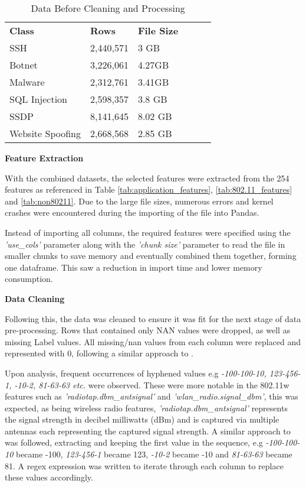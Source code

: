 \begin{table}[H]
\centering
\begin{tabular}{llllll}
\cline{1-3}
\textbf{Class}  & \textbf{Rows} & \textbf{File Size} &  &  &  \\ \cline{1-3}
SSH              & 2,440,571     & 3 GB               &  &  &  \\
Botnet           & 3,226,061     & 4.27GB             &  &  &  \\
Malware          & 2,312,761     & 3.41GB             &  &  &  \\
SQL Injection    & 2,598,357     & 3.8 GB             &  &  &  \\
SSDP             & 8,141,645     & 8.02 GB            &  &  &  \\
Website Spoofing & 2,668,568     & 2.85 GB            &  &  &  \\ \cline{1-3}
\end{tabular}
\caption{Data Before Cleaning and Processing}
\label{tab:full_data}
\end{table}

\medskip

\textbf{Feature Extraction}

\smallskip
With the combined datasets, the selected features were extracted from the 254 features as referenced in Table \ref{tab:application_features}, \ref{tab:802.11_features} and \ref{tab:non80211}. Due to the large file sizes, numerous errors and kernel crashes were encountered during the importing of the file into Pandas. 

Instead of importing all columns, the required features were specified using the \textit{'use\_cols'} parameter along with the \textit{'chunk size'} parameter to read the file in smaller chunks to save memory and eventually combined them together, forming one dataframe. This saw a reduction in import time and lower memory consumption.

\medskip
\textbf{Data Cleaning}

\smallskip
Following this, the data was cleaned to ensure it was fit for the next stage of data pre-processing. Rows that contained only NAN values were dropped, as well as missing Label values. All missing/nan values from each column were replaced and represented with 0, following a similar approach to \textcite{s22155633}.

\smallskip
Upon analysis, frequent occurrences of hyphened values e.g \textit{-100-100-10, 123-456-1, -10-2, 81-63-63 etc.} were observed. These were more notable in the 802.11w features such as \textit{'radiotap.dbm\_antsignal'} and \textit{'wlan\_radio.signal\_dbm'}, this was expected, as being wireless radio features, \textit{'radiotap.dbm\_antsignal'} represents the signal strength in decibel milliwatts (dBm) and is captured via multiple antennas each representing the captured signal strength. A similar approach to \parencite{s22155633} was followed, extracting and keeping the first value in the sequence, e.g \textit{-100-100-10} became -100, \textit{123-456-1} became 123, \textit{-10-2} became -10 and \textit{81-63-63} became 81. A regex expression was written to iterate through each column to replace these values accordingly.

